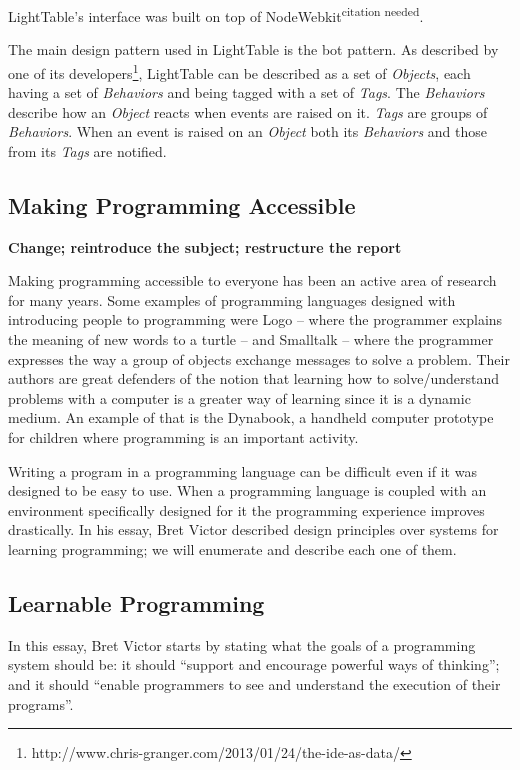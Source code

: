 \documentclass{./llncs2e/llncs}
\begin{document}
	LightTable's interface was built on top of NodeWebkit\textsuperscript{citation needed}.

	The main design pattern used in LightTable is the \ac{bot} pattern. 
	As described by one of its developers\footnote{http://www.chris-granger.com/2013/01/24/the-ide-as-data/}, LightTable can be described as a set of \emph{Objects}, each having a set of \emph{Behaviors} and being tagged with a set of \emph{Tags}. 
	The \emph{Behaviors} describe how an \emph{Object} reacts when events are raised on it. \emph{Tags} are groups of \emph{Behaviors}. 
	When an event is raised on an \emph{Object} both its \emph{Behaviors} and those from its \emph{Tags} are notified.

\subsection{Making Programming Accessible}
	\textbf{Change; reintroduce the subject; restructure the report}

	Making programming accessible to everyone has been an active area of research for many years. 
	Some examples of programming languages designed with introducing people to programming were Logo\cite{papert1999logo} -- where the programmer explains the meaning of new words to a turtle -- and Smalltalk\cite{goldberg1983smalltalk} -- where the programmer expresses the way a group of objects exchange messages to solve a problem. 
	Their authors are great defenders of the notion that learning how to solve/understand problems with a computer is a greater way of learning since it is a dynamic medium. 
	An example of that is the Dynabook\cite{Kay:2011:PCC:800193.1971922}, a handheld computer prototype for children where programming is an important activity.

	Writing a program in a programming language can be difficult even if it was designed to be easy to use. 
	When a programming language is coupled with an environment specifically designed for it the programming experience improves drastically. 
	In his essay\cite{victor2012learnable}, Bret Victor described design principles over systems for learning programming; we will enumerate and describe each one of them.
\subsection{Learnable Programming\cite{victor2012learnable}}
	In this essay, Bret Victor starts by stating what the goals of a programming system should be: it should ``support and encourage powerful ways of thinking''; and it should ``enable programmers to see and understand the execution of their programs''.
\end{document}
